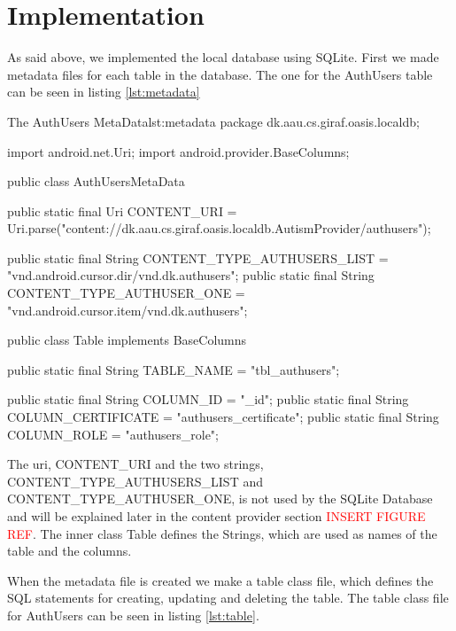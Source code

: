 \section{Implementation}
\label{sec:dbImp}
As said above, we implemented the local database using SQLite. First we made metadata files for each table in the database. The one for the AuthUsers table can be seen in listing \vref{lst:metadata}

\begin{Java}{The AuthUsers MetaData}{lst:metadata}
package dk.aau.cs.giraf.oasis.localdb;

import android.net.Uri;
import android.provider.BaseColumns;

public class AuthUsersMetaData {

	public static final Uri CONTENT_URI = Uri.parse("content://dk.aau.cs.giraf.oasis.localdb.AutismProvider/authusers");

	public static final String CONTENT_TYPE_AUTHUSERS_LIST = "vnd.android.cursor.dir/vnd.dk.authusers";
	public static final String CONTENT_TYPE_AUTHUSER_ONE = "vnd.android.cursor.item/vnd.dk.authusers";

	public class Table implements BaseColumns {
		public static final String TABLE_NAME = "tbl_authusers";

		public static final String COLUMN_ID = "_id";
		public static final String COLUMN_CERTIFICATE = "authusers_certificate";
		public static final String COLUMN_ROLE = "authusers_role";
	}
}
\end{Java}

The uri, CONTENT\_URI and the two strings, CONTENT\_TYPE\_AUTHUSERS\_LIST and CONTENT\_TYPE\_AUTHUSER\_ONE, is not used by the SQLite Database and will be explained later in the content provider section \textcolor{red}{INSERT FIGURE REF}. The inner class Table defines the Strings, which are used as names of the table and the columns.

When the metadata file is created we make a table class file, which defines the SQL statements for creating, updating and deleting the table. The table class file for AuthUsers can be seen in listing \vref{lst:table}.

